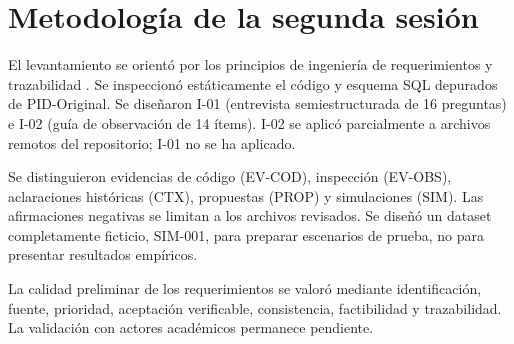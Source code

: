 \section{Metodología de la segunda sesión}
El levantamiento se orientó por los principios de ingeniería de requerimientos y trazabilidad \cite{nuseibeh2000,wiegers2013}. Se inspeccionó estáticamente el código y esquema SQL depurados de PID-Original. Se diseñaron I-01 (entrevista semiestructurada de 16 preguntas) e I-02 (guía de observación de 14 ítems). I-02 se aplicó parcialmente a archivos remotos del repositorio; I-01 no se ha aplicado.

Se distinguieron evidencias de código (EV-COD), inspección (EV-OBS), aclaraciones históricas (CTX), propuestas (PROP) y simulaciones (SIM). Las afirmaciones negativas se limitan a los archivos revisados. Se diseñó un dataset completamente ficticio, SIM-001, para preparar escenarios de prueba, no para presentar resultados empíricos.

La calidad preliminar de los requerimientos se valoró mediante identificación, fuente, prioridad, aceptación verificable, consistencia, factibilidad y trazabilidad. La validación con actores académicos permanece pendiente.
